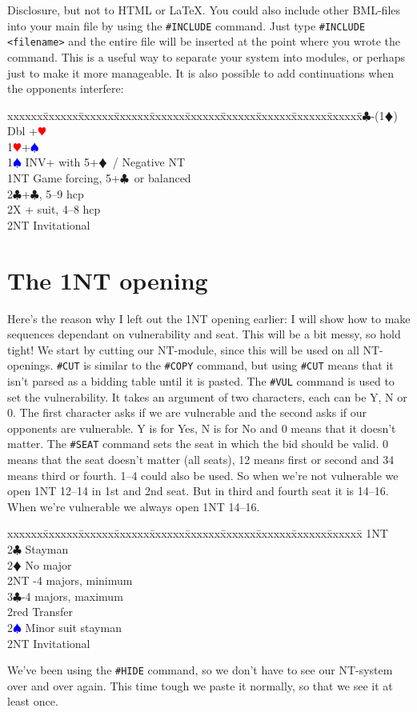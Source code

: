\documentclass[a4paper]{article}
\newcommand{\BC}{\textcolor{OliveGreen}{$\clubsuit$}}
\newcommand{\BD}{\textcolor{RedOrange}{$\vardiamondsuit$}}
\newcommand{\BH}{\textcolor{Red}{$\varheartsuit${}}}
\newcommand{\BS}{\textcolor{Blue}{$\spadesuit${}}}
\newenvironment{bidtable}
{\begin{tabbing}

xxxxxx\=xxxxxx\=xxxxxx\=xxxxxx\=xxxxxx\=xxxxxx\=xxxxxx\=xxxxxx\=xxxxxx\=xxxxxx\=\kill}
{\end{tabbing} }%
\begin{document}
Disclosure, but not to HTML or LaTeX.
\bigbreak
You could also include other BML-files into your main file by using
the \texttt{\#INCLUDE} command. Just type \texttt{\#INCLUDE <filename>} and the entire
file will be inserted at the point where you wrote the command. This
is a useful way to separate your system into modules, or perhaps
just to make it more manageable.
\bigbreak
It is also possible to add continuations when the opponents
interfere:
\bigbreak
\begin{bidtable}
1\BC-(1\BD)\+\\
Dbl +\BH \\
1\BH {}+\BS \\
1\BS \> INV+ with 5+\BD\ / Negative NT\\
1NT \> Game forcing, 5+\BC\ or balanced\\
2\BC {}+\BC , 5--9 hcp\\
2X + suit, 4--8 hcp\\
2NT \> Invitational\-
\end{bidtable}
\bigbreak
\section{The 1NT opening}

Here's the reason why I left out the 1NT opening earlier: I will
show how to make sequences dependant on vulnerability and
seat. This will be a bit messy, so hold tight!
\bigbreak
We start by cutting our NT-module, since this will be used on all
NT-openings. \texttt{\#CUT} is similar to the \texttt{\#COPY} command, but using \texttt{\#CUT}
means that it isn't parsed as a bidding table until it is pasted.
\bigbreak
The \texttt{\#VUL} command is used to set the vulnerability. It takes an
argument of two characters, each can be Y, N or 0. The first
character asks if we are vulnerable and the second asks if our
opponents are vulnerable. Y is for Yes, N is for No and 0 means that
it doesn't matter.
\bigbreak
The \texttt{\#SEAT} command sets the seat in which the bid should be valid. 0
means that the seat doesn't matter (all seats), 12 means first or
second and 34 means third or fourth. 1--4 could also be used.
\bigbreak
So when we're not vulnerable we open 1NT 12--14 in 1st and 2nd seat.
\bigbreak
But in third and fourth seat it is 14--16.
\bigbreak
When we're vulnerable we always open 1NT 14--16.
\bigbreak
\begin{bidtable}
1NT\+\\
2\BC \> Stayman\+\\
2\BD \> No major\\
2NT -4 majors, minimum\\
3\BC {}-4 majors, maximum\-\\
2red \> Transfer\\
2\BS \> Minor suit stayman\\
2NT \> Invitational\-
\end{bidtable}
\bigbreak
We've been using the \texttt{\#HIDE} command, so we don't have to see our
NT-system over and over again. This time tough we paste it
normally, so that we see it at least once.
\bigbreak
\end{document}

